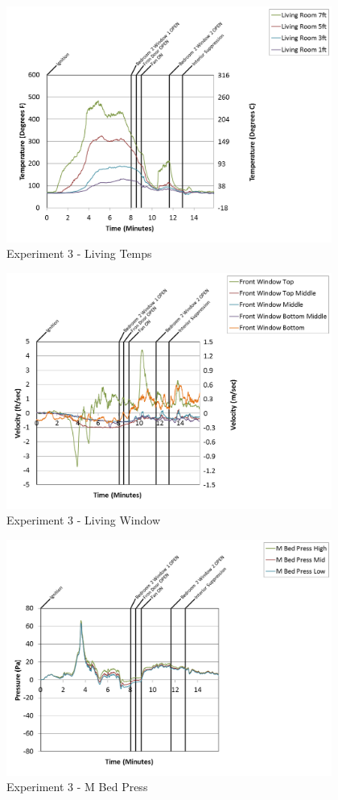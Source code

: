 \documentclass{article}
\begin{document}
\begin{appendices}
\begin{figure}[h!]
	\centering
	\includegraphics[height=3.05in]{0_Images/Results_Charts/Exp_3_Charts/LivingTemps.png}
	\caption{Experiment 3 - Living Temps}
\end{figure}

\clearpage

\begin{figure}[h!]
	\centering
	\includegraphics[height=3.05in]{0_Images/Results_Charts/Exp_3_Charts/LivingWindow.png}
	\caption{Experiment 3 - Living Window}
\end{figure}


\begin{figure}[h!]
	\centering
	\includegraphics[height=3.05in]{0_Images/Results_Charts/Exp_3_Charts/MBedPress.png}
	\caption{Experiment 3 - M Bed Press}
\end{figure}


\end{appendices}
\end{document}
